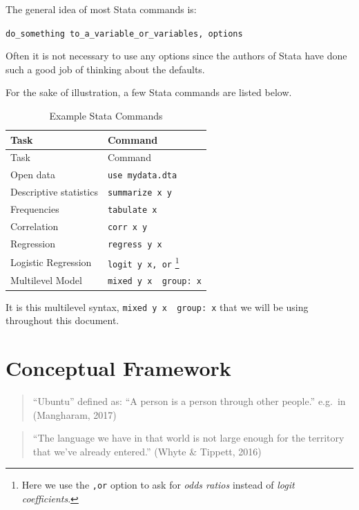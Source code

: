 \documentclass[
  letterpaper,
  DIV=11,
  numbers=noendperiod]{scrreprt}
\begin{document}
The general idea of most Stata commands is:

\texttt{do\_something\ to\_a\_variable\_or\_variables,\ options}

Often it is not necessary to use any options since the authors of Stata
have done such a good job of thinking about the defaults.

For the sake of illustration, a few Stata commands are listed below.

\begin{longtable}[]{@{}ll@{}}
\caption{Example Stata Commands}\label{tbl-Statacommands}\tabularnewline
\toprule\noalign{}
Task & Command \\
\midrule\noalign{}
\endfirsthead
\toprule\noalign{}
Task & Command \\
\midrule\noalign{}
\endhead
\bottomrule\noalign{}
\endlastfoot
Open data & \texttt{use\ mydata.dta} \\
Descriptive statistics & \texttt{summarize\ x\ y} \\
Frequencies & \texttt{tabulate\ x} \\
Correlation & \texttt{corr\ x\ y} \\
Regression & \texttt{regress\ y\ x} \\
Logistic Regression & \texttt{logit\ y\ x,\ or} \footnote{Here we use
  the \texttt{,or} option to ask for \emph{odds ratios} instead of
  \emph{logit coefficients}.} \\
Multilevel Model &
\texttt{mixed\ y\ x\ \textbar{}\textbar{}\ group:\ x} \\
\end{longtable}

It is this multilevel syntax,
\texttt{mixed\ y\ x\ \textbar{}\textbar{}\ group:\ x} that we will be
using throughout this document.


\chapter{Conceptual Framework}\label{sec-conceptualframework}

\begin{quote}
``Ubuntu'' defined as: ``A person is a person through other people.''
e.g.~in (Mangharam, 2017)
\end{quote}

\begin{quote}
``The language we have in that world is not large enough for the
territory that we've already entered.'' (Whyte \& Tippett, 2016)
\end{quote}
\end{document}
